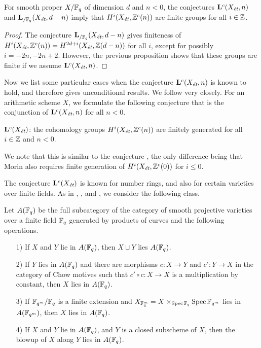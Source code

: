 \documentclass{article}
\numberwithin{equation}{section}
\begin{document}
\begin{proposition}
  \label{prop:Lc-Xet-n-over-finite-fields}
  For smooth proper $X/\FF_q$ of dimension $d$ and $n < 0$, the conjectures
  $\mathbf{L}^c (X_\et, n)$ and $\mathbf{L}_{/\FF_q} (X_\et, d-n)$ imply that
  $H^i (X_\et, \ZZ^c (n))$ are finite groups for all $i \in \ZZ$.

  \begin{proof}
    The conjecture $\mathbf{L}_{/\FF_q} (X_\et, d-n)$ gives finiteness of
    $H^i (X_\et, \ZZ^c (n)) = H^{2d + i} (X_\et, \ZZ (d-n))$ for all $i$, except
    for possibly $i = -2n, -2n + 2$. However, the previous proposition shows
    that these groups are finite if we assume $\mathbf{L}^c (X_\et, n)$.
  \end{proof}
\end{proposition}

Now we list some particular cases when the conjecture $\mathbf{L}^c (X_\et,n)$
is known to hold, and therefore gives unconditional results. We follow
\cite[\S 5]{Morin-2014} very closely. For an arithmetic scheme $X$, we formulate
the following conjecture that is the conjunction of $\mathbf{L}^c (X_\et,n)$ for
all $n < 0$.

\begin{conjecture}
  $\mathbf{L}^c (X_\et)$: the cohomology groups $H^i (X_\et, \ZZ^c (n))$ are
  finitely generated for all $i \in \ZZ$ and $n < 0$.
\end{conjecture}

We note that this is similar to the conjecture
\cite[Definition~5.8]{Morin-2014}, the only difference being that Morin also
requires finite generation of $H^i (X_\et, \ZZ^c (0))$ for $i \le 0$.

The conjecture $\mathbf{L}^c (X_\et)$ is known for number rings, and also for
certain varieties over finite fields. As in \cite{Soule-1984},
\cite{Geisser-2004}, and \cite{Morin-2014}, we consider the following class.

\begin{definition}
  Let $A (\FF_q)$ be the full subcategory of the category of smooth projective
  varieties over a finite field $\FF_q$ generated by products of curves and the
  following operations.
  \begin{enumerate}
  \item[1)] If $X$ and $Y$ lie in $A (\FF_q)$, then $X \sqcup Y$ lies
    $A (\FF_q)$.
  \item[2)] If $Y$ lies in $A (\FF_q)$ and there are morphisms $c\colon X\to Y$
    and $c'\colon Y\to X$ in the category of Chow motives such that
    $c'\circ c\colon X\to X$ is a multiplication by constant, then
    $X$ lies in $A (\FF_q)$.
  \item[3)] If $\FF_{q^m}/\FF_q$ is a finite extension and
    $X_{\FF_q^m} = X \times_{\Spec \FF_q} \Spec \FF_{q^m}$ lies in
    $A (\FF_{q^m})$, then $X$ lies in $A (\FF_q)$.
  \item[4)] If $X$ and $Y$ lie in $A (\FF_q)$, and $Y$ is a closed subscheme of
    $X$, then the blowup of $X$ along $Y$ lies in $A (\FF_q)$.
  \end{enumerate}
\end{definition}
\end{document}
